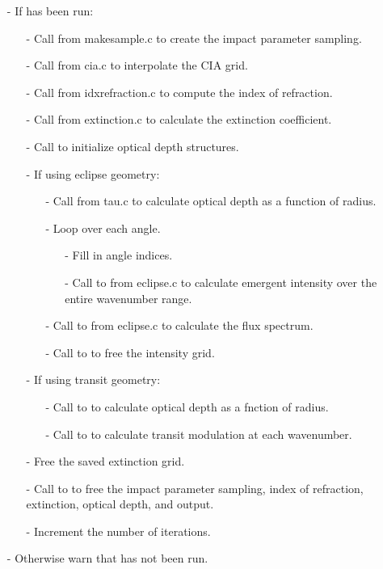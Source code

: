 \documentclass[letterpaper,12pt]{article}
\begin{document}
\begin{enumerate}[leftmargin=10pt, noitemsep, parsep=0pt, topsep=0ex]
\item[-] If  has been run:
\begin{enumerate}[leftmargin=10pt, noitemsep, parsep=0pt, topsep=0ex]
\item[-] Call  from makesample.c to create the impact parameter sampling.
\item[-] Call  from cia.c to interpolate the CIA grid.
\item[-] Call  from idxrefraction.c to compute the index of refraction.
\item[-] Call  from extinction.c to calculate the extinction coefficient.
\item[-] Call  to initialize optical depth structures.
\item[-] If using eclipse geometry:
\begin{enumerate}[leftmargin=10pt, noitemsep, parsep=0pt, topsep=0ex]
\item[-] Call  from tau.c to calculate optical depth as a function of radius.
\item[-] Loop over each angle.
\begin{enumerate}[leftmargin=10pt, noitemsep, parsep=0pt, topsep=0ex]
\item[-] Fill in angle indices.
\item[-] Call to  from eclipse.c to calculate emergent intensity over the entire wavenumber range.
\end{enumerate}
\item[-] Call to  from eclipse.c to calculate the flux spectrum.
\item[-] Call to  to free the intensity grid.
\end{enumerate}
\item[-] If using transit geometry:
\begin{enumerate}[leftmargin=10pt, noitemsep, parsep=0pt, topsep=0ex]
\item[-] Call to  to calculate optical depth as a fnction of radius.
\item[-] Call to  to calculate transit modulation at each wavenumber.
\end{enumerate}
\item[-] Free the saved extinction grid.
\item[-] Call to  to free the impact parameter sampling, index of refraction, extinction, optical depth, and output.
\item[-] Increment the number of iterations.
\end{enumerate}
\item[-] Otherwise warn that  has not been run.
\end{enumerate}
\end{document}
